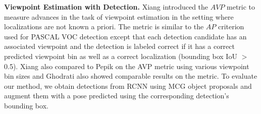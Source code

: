 \renewcommand{\arraystretch}{1.4}
\setlength{\tabcolsep}{6pt}
\begin{table}[htb!]
\centering
{}

\caption{Mean performance of our approach for various metrics. The detailed results for  individual classes can be found at the PASCAL3D leaderboard (\url{http://cvgl.stanford.edu/projects/pascal3d.html}).}
\label{table:poseDetEval}
\end{table}

\vspace{3mm}
\noindent \textbf{Viewpoint Estimation with Detection.}
Xiang \etal \cite{pascal3d} introduced the $AVP$ metric to measure advances in the task of viewpoint estimation in the setting where localizations are not known a priori. The metric is similar to the $AP$ criterion used for PASCAL VOC detection except that each detection candidate has an associated viewpoint and the detection is labeled correct if it has a correct predicted viewpoint bin as well as a correct localization (bounding box IoU $>$ 0.5). Xiang \etal \cite{pascal3d} also compared to Pepik \etal \cite{pepik12dpm} on the AVP metric using various viewpoint bin sizes and Ghodrati \etal \cite{ghodrati14viewpoint} also showed comparable results on the metric. To evaluate our method, we obtain detections from RCNN \cite{rcnn} using MCG \cite{mcg2014} object proposals and augment them with a pose predicted using the corresponding detection's bounding box.

